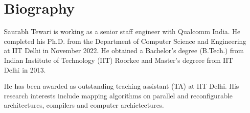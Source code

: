 \chapter*{Biography}

{Saurabh Tewari} is working as a senior staff engineer with Qualcomm India. He completed his Ph.D. from the Department of Computer Science and Engineering at IIT Delhi in November 2022. He obtained a Bachelor's degree (B.Tech.) from Indian Institute of Technology (IIT) Roorkee and Master's degreee from IIT Delhi in 2013. 

He has been awarded as outstanding teaching assistant (TA) at IIT Delhi.
His research interests include mapping algorithms on parallel and reconfigurable architectures, compilers and computer archictectures.